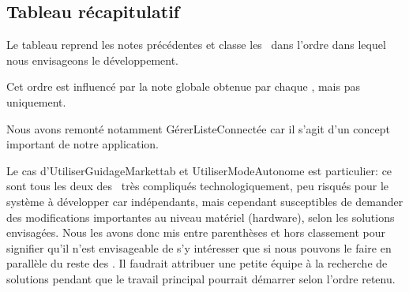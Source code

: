 \subsection{Tableau récapitulatif}

Le tableau \in[CLASSEMENT] reprend les notes précédentes et classe les \cu\ dans l'ordre dans lequel nous envisageons le développement.
    
Cet ordre est influencé par la note globale obtenue par chaque \cu, mais pas uniquement. 
\par
Nous avons remonté notamment GérerListeConnectée car il s'agit d'un concept important de notre application. 
\par
Le cas d'UtiliserGuidageMarkettab et UtiliserModeAutonome est particulier: ce sont tous les deux des \cu\ très compliqués technologiquement, peu risqués pour le système à développer car indépendants, mais cependant susceptibles de demander des modifications importantes au niveau matériel (hardware), selon les solutions envisagées.
Nous les avons donc mis entre parenthèses et hors classement pour signifier qu'il n'est envisageable de s'y intéresser que si nous pouvons le faire en parallèle du reste des \cu. 
Il faudrait attribuer une petite équipe à la recherche de solutions pendant que le travail principal pourrait démarrer selon l'ordre retenu.
